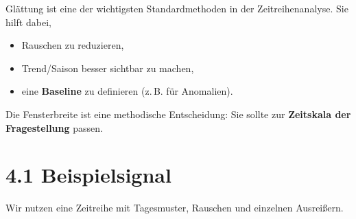 \documentclass[
  ngerman,
  letterpaper,
  DIV=11]{scrreprt}
\providecommand{\tightlist}{%
  \setlength{\itemsep}{0pt}\setlength{\parskip}{0pt}}
\begin{document}
Glättung ist eine der wichtigsten Standardmethoden in der
Zeitreihenanalyse. Sie hilft dabei,

\begin{itemize}
\tightlist
\item
  Rauschen zu reduzieren,
\item
  Trend/Saison besser sichtbar zu machen,
\item
  eine \textbf{Baseline} zu definieren (z.\,B. für Anomalien).
\end{itemize}

\begin{tcolorbox}[enhanced jigsaw, titlerule=0mm, title=\textcolor{quarto-callout-note-color}{\faInfo}\hspace{0.5em}{Merke}, bottomrule=.15mm, opacityback=0, colbacktitle=quarto-callout-note-color!10!white, coltitle=black, opacitybacktitle=0.6, colframe=quarto-callout-note-color-frame, toprule=.15mm, leftrule=.75mm, arc=.35mm, rightrule=.15mm, breakable, bottomtitle=1mm, colback=white, toptitle=1mm, left=2mm]

Die Fensterbreite ist eine methodische Entscheidung: Sie sollte zur
\textbf{Zeitskala der Fragestellung} passen.

\end{tcolorbox}

\section{4.1 Beispielsignal}\label{beispielsignal}

Wir nutzen eine Zeitreihe mit Tagesmuster, Rauschen und einzelnen
Ausreißern.
\end{document}
